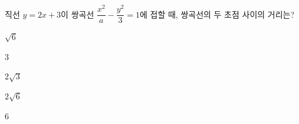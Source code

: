 직선 $y=2x+3$이 쌍곡선 $\dfrac{x^2}{a}-\dfrac{y^2}{3}=1$에 접할 때, 쌍곡선의 두 초점 사이의 거리는? 
\begin{choices32}{\rule[-3ex]{0pt}{8ex}$\sqrt{6}$}{\rule[-3ex]{0pt}{8ex}$3$}{\rule[-3ex]{0pt}{8ex}$2\sqrt{3}$}{\rule[-3ex]{0pt}{8ex}$2\sqrt{6}$}{\rule[-3ex]{0pt}{8ex}$6$}\end{choices32}
